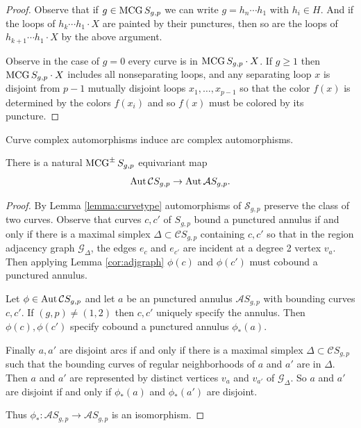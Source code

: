 \begin{proof}
  Observe that if $g \in \operatorname{MCG} S_{g,p}$
  we can write $g= h_n \cdots h_1$ with $h_i \in H$.
  And if the loops of $h_k \cdots h_1 \cdot X$ are painted by their punctures,
  then so are the loops of $h_{k+1} \cdots h_1 \cdot X$ by the above argument.

  Observe in the case of $g=0$ every curve is in $\operatorname{MCG} S_{g,p} \cdot X$.
  If $g \geq 1$ then $\operatorname{MCG} S_{g,p} \cdot X$ includes all nonseparating loops,
  and any separating loop $x$ is disjoint from $p-1$ mutually disjoint loops $x_1,\ldots, x_{p-1}$
  so that
  the color $f(x)$ is determined by
  the colors
  $f(x_i)$
  and so $f(x)$ must be colored by its puncture.
\end{proof}


\begin{lemma}
  Curve complex automorphisms induce
  arc complex automorphisms.

   There is a natural $\operatorname{MCG}^\pm S_{g,p}$ equivariant map
   $$\operatorname{Aut} \mathcal C S_{g,p} \to \operatorname{Aut} \mathcal A S_{g,p}.$$
  \label{lemma:annulus}
\end{lemma}

\begin{proof}
  By Lemma \ref{lemma:curvetype}
  automorphisms of $\mathcal S_{g,p}$
  preserve the class of two curves.
  Observe that curves $c,c'$ of $S_{g,p}$
  bound a punctured annulus if and only if there
  is a maximal simplex $\Delta \subset \mathcal C S_{g,p}$
  containing $c,c'$
  so that in the region adjacency graph $\mathcal G_\Delta$,
  the edges $e_c$ and $e_{c'}$ are incident
  at a degree 2 vertex $v_a$.
  Then applying Lemma \ref{cor:adjgraph}
  $\phi(c)$ and $\phi(c')$ must cobound a punctured annulus.

  Let $\phi \in \operatorname{Aut} \mathcal C S_{g,p}$
  and let $a$ be an punctured annulus $\mathcal A S_{g,p}$
  with bounding curves $c,c'$.
  If $(g,p) \neq (1,2)$ then $c,c'$ uniquely specify the annulus.
  Then $\phi(c),\phi(c')$ specify cobound a punctured annulus $\phi_\ast(a)$.

  Finally $a,a'$ are disjoint arcs if and only if
  there is a maximal simplex $\Delta \subset \mathcal C S_{g,p}$
  such that the bounding curves of regular neighborhoods of
  $a$ and $a'$
  are in $\Delta$.
  Then $a$ and $a'$ are represented by distinct
  vertices $v_a$ and $v_{a'}$ of $\mathcal G_\Delta$.
  So $a$ and $a'$ are disjoint if and only if
  $\phi_\ast (a)$ and $\phi_\ast (a')$ are disjoint.

  Thus $\phi_\ast : \mathcal A S_{g,p} \to \mathcal A S_{g,p}$
  is an isomorphism.
\end{proof}





